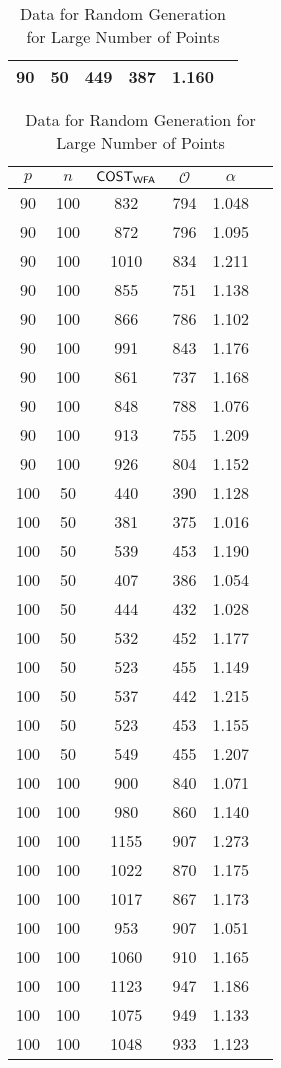 \begin{table}[!hb]
{\begin{tabular}{|c|c|c|c|c|c|}
90  & 50   & 449       & 387	& 1.160 \\
\hline
\end{tabular}
}
\hfill
\parbox{.45\linewidth}{
\centering
\begin{tabular}{|c|c|c|c|c|c|}
\hline
$p$ & $n$ & $\sf{COST}_{\sf{WFA}}$ & $\mathcal{O}$ & $\alpha$ \\
\hline
90  & 100  & 832       & 794	& 1.048 \\
90  & 100  & 872       & 796	& 1.095 \\
90  & 100  & 1010      & 834	& 1.211 \\
90  & 100  & 855       & 751	& 1.138 \\
90  & 100  & 866       & 786	& 1.102 \\
90  & 100  & 991       & 843	& 1.176 \\
90  & 100  & 861       & 737	& 1.168 \\
90  & 100  & 848       & 788	& 1.076 \\
90  & 100  & 913       & 755	& 1.209 \\
90  & 100  & 926       & 804	& 1.152 \\
100 & 50  & 440  & 390	& 1.128 \\
100 & 50  & 381  & 375	& 1.016 \\
100 & 50  & 539  & 453	& 1.190 \\
100 & 50  & 407  & 386	& 1.054 \\
100 & 50  & 444  & 432	& 1.028 \\
100 & 50  & 532  & 452	& 1.177 \\
100 & 50  & 523  & 455	& 1.149 \\
100 & 50  & 537  & 442	& 1.215 \\
100 & 50  & 523  & 453	& 1.155 \\
100 & 50  & 549  & 455	& 1.207 \\
100 & 100 & 900  & 840	& 1.071 \\
100 & 100 & 980  & 860	& 1.140 \\
100 & 100 & 1155 & 907	& 1.273 \\
100 & 100 & 1022 & 870	& 1.175 \\
100 & 100 & 1017 & 867	& 1.173 \\
100 & 100 & 953  & 907	& 1.051 \\
100 & 100 & 1060 & 910	& 1.165 \\
100 & 100 & 1123 & 947	& 1.186 \\
100 & 100 & 1075 & 949	& 1.133 \\
100 & 100 & 1048 & 933	& 1.123 \\
\hline
\end{tabular}
}
\caption{Data for Random Generation for Large Number of Points}
\label{tab:dat-20}
\end{table}



